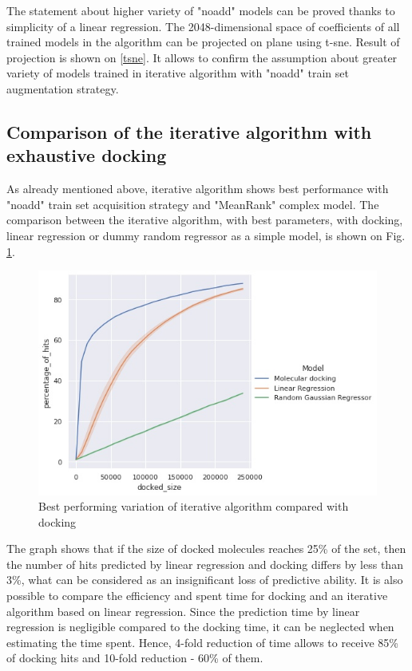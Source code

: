 The statement about higher variety of "noadd" models can be proved thanks to simplicity of a linear regression.
The 2048-dimensional space of coefficients of all trained models in the algorithm can be projected on plane using t-sne.
Result of projection is shown on \ref{tsne}. 
It allows to confirm the assumption about greater variety of models trained in iterative algorithm with "noadd" train set augmentation strategy.

\subsection{Comparison of the iterative algorithm with exhaustive docking}

As already mentioned above, iterative algorithm shows best performance with "noadd" train set acquisition strategy and "MeanRank" complex model.
The comparison between the iterative algorithm, with best parameters, with docking,  linear regression or dummy random regressor as a simple model, is shown on Fig. \ref{best}. 

\begin{figure}[H]
    \centering
    \includegraphics[width = \linewidth]{Images/4eiyPercentageOfHits.jpg}
    \caption{Best performing variation of iterative algorithm compared with docking}
    \label{best}
\end{figure}


The graph shows that if the size of docked molecules reaches 25\% of the set, then the number of hits predicted by linear regression and docking differs by less than 3\%, what can be considered as an insignificant loss of predictive ability.
It is also possible to compare the efficiency and spent time for docking and an iterative algorithm based on linear regression.
Since the prediction time by linear regression is negligible compared to the docking time, it can be neglected when estimating the time spent. 
Hence, 4-fold reduction of time allows to receive 85\% of docking hits and 10-fold reduction - 60\% of them.

